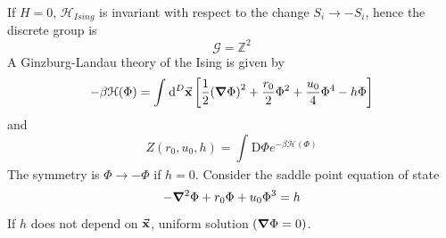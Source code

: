 \documentclass[../main/main.tex]{subfiles}
\begin{document}
If \( H=0 \), \( \mathcal{H}_{Ising} \) is invariant with respect to the change \( S_i \rightarrow -S_i \), hence the discrete group is
\begin{equation}
  \mathcal{G} = \mathbb{Z}^2
\end{equation}
A Ginzburg-Landau theory of the Ising is given by
\begin{equation}
  - \beta \mathcal{H} (\Phi ) = \int_{}^{} \dd[D]{\va{x}} \qty[ \frac{1}{2} \qty(\grad \Phi )^2 + \frac{r_0}{2} \Phi ^2 + \frac{u_0}{4} \Phi ^4 - h \Phi ]
\end{equation}
and
\begin{equation}
  Z (r_0,u_0,h) = \int_{}^{} \text{D} \Phi  e^{-\beta \mathcal{H} (\Phi )}
\end{equation}
The symmetry is \( \Phi \rightarrow - \Phi  \) if \( h=0 \).
Consider the saddle point equation of state
\begin{equation}
  - \grad ^2 \Phi + r_0 \Phi + u_0 \Phi ^3 = h
\end{equation}
If \( h \) does not depend on \( \va{x} \), uniform solution \( (\grad \Phi =0) \).
\end{document}

